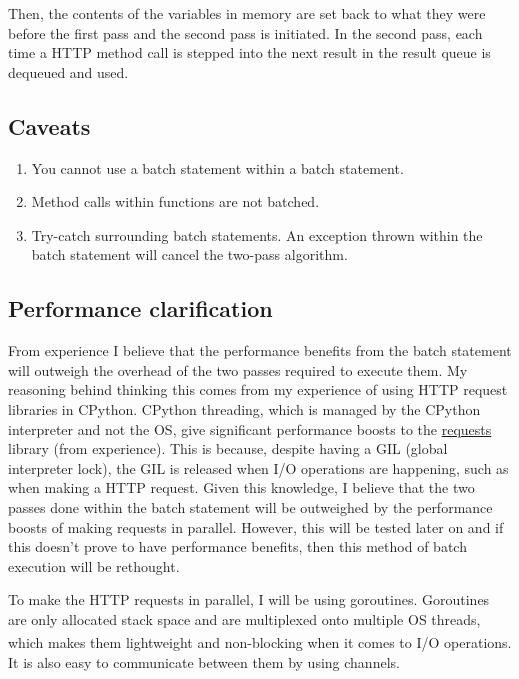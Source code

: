 \documentclass[]{interim}
\theoremstyle{definition}
\begin{document}
Then, the contents of the variables in memory are set back to what they were before the first pass and the second pass is initiated. In the second pass, each time a HTTP method call is stepped into the next result in the result queue is dequeued and used.

\subsection{Caveats}

\begin{enumerate}
    \item You cannot use a batch statement within a batch statement.
    \item Method calls within functions are not batched.
    \item Try-catch surrounding batch statements. An exception thrown within the batch statement will cancel the two-pass algorithm.
\end{enumerate}

\subsection{Performance clarification}

From experience I believe that the performance benefits from the batch statement will outweigh the overhead of the two passes required to execute them. My reasoning behind thinking this comes from my experience of using HTTP request libraries in CPython. CPython threading, which is managed by the CPython interpreter and not the OS, give significant performance boosts to the \href{https://docs.python-requests.org/en/latest/}{requests} library (from experience). This is because, despite having a GIL (global interpreter lock), the GIL is released when I/O operations are happening, such as when making a HTTP request. Given this knowledge, I believe that the two passes done within the batch statement will be outweighed by the performance boosts of making requests in parallel. However, this will be tested later on and if this doesn't prove to have performance benefits, then this method of batch execution will be rethought.

To make the HTTP requests in parallel, I will be using goroutines. Goroutines are only allocated stack space and are multiplexed onto multiple OS threads, which makes them lightweight and non-blocking when it comes to I/O operations\textsuperscript{\cite{effective-go}}. It is also easy to communicate between them by using channels.
\end{document}
